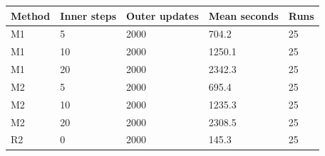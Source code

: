 \begin{tabular}{lllll}
\toprule
Method & Inner steps & Outer updates & Mean seconds & Runs \\
\midrule
M1 & 5 & 2000 & 704.2 & 25 \\
M1 & 10 & 2000 & 1250.1 & 25 \\
M1 & 20 & 2000 & 2342.3 & 25 \\
M2 & 5 & 2000 & 695.4 & 25 \\
M2 & 10 & 2000 & 1235.3 & 25 \\
M2 & 20 & 2000 & 2308.5 & 25 \\
R2 & 0 & 2000 & 145.3 & 25 \\
\bottomrule
\end{tabular}
